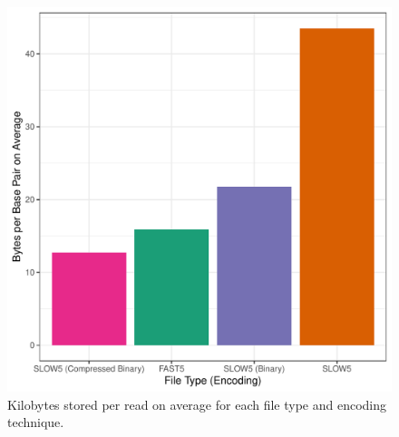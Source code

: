\begin{figure}[h]
    \includegraphics[width=\linewidth]{../../plots/gpgpu_size.pdf}
    \caption{Kilobytes stored per read on average for each file type and encoding technique.\label{fig:size}}
\end{figure}
